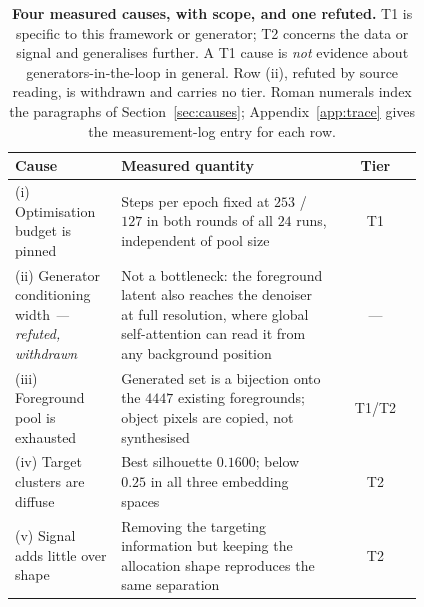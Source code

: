 \documentclass{article}
\begin{document}
\begin{table}[t]
\caption{\textbf{Four measured causes, with scope, and one refuted.} T1 is
specific to this framework or generator; T2 concerns the data or signal and
generalises further. A T1 cause is \emph{not} evidence about
generators-in-the-loop in general. Row (ii), refuted by source reading, is
withdrawn and carries no tier. Roman numerals index
the paragraphs of Section~\ref{sec:causes};
Appendix~\ref{app:trace} gives the measurement-log entry for each row.}
\label{tab:causes}
\begin{center}
\footnotesize
\begin{tabular}{@{}p{0.265\linewidth}p{0.545\linewidth}c@{}}
\toprule
Cause & Measured quantity & Tier \\
\midrule
(i) Optimisation budget is pinned & Steps per epoch fixed at $253$ / $127$ in both rounds of all $24$ runs, independent of pool size & T1 \\
(ii) Generator conditioning width \emph{--- refuted, withdrawn} & Not a bottleneck: the foreground latent also reaches the denoiser at full resolution, where global self-attention can read it from any background position & --- \\
(iii) Foreground pool is exhausted & Generated set is a bijection onto the $4447$ existing foregrounds; object pixels are copied, not synthesised & T1/T2 \\
(iv) Target clusters are diffuse & Best silhouette $0.1600$; below $0.25$ in all three embedding spaces & T2 \\
(v) Signal adds little over shape & Removing the targeting information but keeping the allocation shape reproduces the same separation & T2 \\
\bottomrule
\end{tabular}
\end{center}
\end{table}
\end{document}

